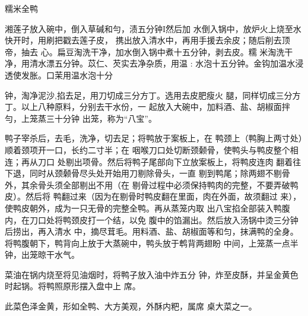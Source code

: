\begin{recipe}[八宝全鸭]{糯米全鸭}

\ingredients


\cooking

湘莲子放入碗中，倒入草碱和勻，渍五分钟I然后加 水倒入锅中，放炉火上烧至水快开时，用刷把戳去莲子皮， 携出放入清水中，再用手援去余皮；随后削去顶帝，抽去 心。扁豆淘洗干净，加水倒入锅中煮十五分钟，剥去皮。糯 米淘洗干净，用清水漂五分钟。苡仁、芡实去净杂质，用温 : 水泡十五分钟。金钩加温水浸透使发胀。口茉用温水泡十分

钟，淘净泥沙,掐去足，用刀切成三分方丁。选用去皮肥瘦火 腿，同样切成三分方丁。以上八种原料，分别去干水份，一 起放入大碗中，加料酒、盐、胡椒面拌勻，上笼蒸三十分钟 出笼，称为“八宝”。

\step 鸭子宰杀后，去毛，洗净，切去足；将鸭放于案板上，在 鸭颈上（鸭胸上两寸处）顺着颈项开一口，长约二寸半；在 咽喉刀口处切断颈颡骨，使鸭头与鸭皮整个相连；再从刀口 处剔出项骨。然后将鸭子尾部向下立放案板上，将鸭皮连肉 翻着往下退，同时从颈颡骨尽头处开始用刀剔除骨头，一直 剔到鸭尾；除两翅不剔骨外，其余骨头须全部剔出不用（在 剔骨过程中必须保持鸭肉的完整，不要弄破鸭皮）。然后将 鸭翻过来（因为在剔骨时鸭皮翻在里面，肉在外面，故须翻过 来），使鸭皮朝外，成为一只无骨的完整全鸭。再从蒸笼内取 出八宝掐全部装入鸭腹内，在刀口处将鸭颈皮打一个结，以免 腹中的馅漏出。然后放入汤锅中烫三分钟后捞出，再入清水 中，摘尽茸毛。用料酒、盐、胡椒面等和匀，抹满鸭的全身。 将鸭腹朝下，鸭背向上放于大蒸碗中，鸭头放于鹎背两翅盼 中间，上笼蒸一点半钟，出笼晾干水气。

\step 菜油在锅内烧至将见油烟时，将鸭子放入油中炸五分 钟，炸至皮酥，并呈金黄色时起锅。将鸭照原形摆入盘中上 席。

\notes

此菜色泽金黄，形如全鸭、大方美观，外酥内粑，属席 桌大菜之一。

\end{recipe}

